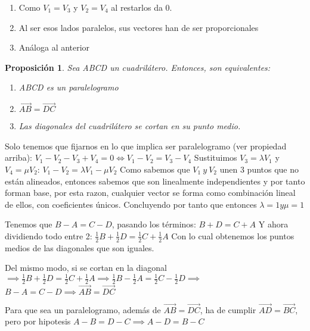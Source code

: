 \documentclass[11pt, a4paper, titlepage]{article}
\makeatletter
\renewenvironment{proof}[1][\proofname] {\vspace{-15pt}\par\pushQED{\qed}\normalfont\topsep6\p@\@plus6\p@\relax\trivlist\item[\hskip\labelsep\it#1\@addpunct{.}]\ignorespaces}{\popQED\endtrivlist\@endpefalse}
\renewcommand{\vec}{\overrightarrow}
\renewenvironment{proof}[1][\proofname] {\par\pushQED{\qed}\normalfont\topsep6\p@\@plus6\p@\relax\trivlist\item[\hskip\labelsep\itshape\sffamily#1\@addpunct{.}]\ignorespaces}{\popQED\endtrivlist\@endpefalse}
\theoremstyle{theorem-style}
\newtheorem{nprop}{Proposición}[section]
\theoremstyle{definition-style}
\theoremstyle{remark-style}
\theoremstyle{example-style}
\newenvironment{nlist}
{\begin{enumerate}
    \renewcommand\labelenumi{(\emph{\roman{enumi})}}}
  {\end{enumerate}}
\makeatother
\begin{document}
\begin{proof}
	\begin{nlist} 
		\item Como $V_1 = V_3$ y $V_2 = V_4$ al restarlos da 0.
		\item Al ser esos lados paralelos, sus vectores han de ser proporcionales
		\item Análoga al anterior
	\end{nlist}
\end{proof}


\begin{nprop}
  Sea ABCD un cuadrilátero. Entonces, son equivalentes:
  \begin{nlist}
  \item ABCD es un paralelogramo
  \item $\vec{AB} = \vec{DC}$
  \item Las diagonales del cuadrilátero se cortan en su punto medio.
  \end{nlist}
\end{nprop}


\begin{proof}\hfill
  Solo tenemos que fijarnos en lo que implica ser paralelogramo (ver propiedad arriba):
  $V_{1} - V_{2} - V_{3} + V_{4} = 0 \Leftrightarrow V_{1} - V_{2} = V_{3} - V_{4} $
  Sustituimos $V_{3} = \lambda V_{1}$ y $V_{4} = \mu V_{2}$:
  $V_{1} - V_{2} = \lambda V_{1} - \mu V_{2}$
  Como sabemos que $V_{1}\ y\ V_{2}$ unen 3 puntos que no están alineados, entonces sabemos que son linealmente independientes y por
  tanto forman base, por esta razon, cualquier vector se forma como combinación lineal de ellos, con coeficientes únicos.
  Concluyendo por tanto que entonces $\lambda = 1 y \mu = 1$

  Tenemos que $B - A = C - D$, pasando los términos:
  $B + D = C + A$
  Y ahora dividiendo todo entre 2:
  $\frac{1}{2}B + \frac{1}{2}D = \frac{1}{2}C + \frac{1}{2}A$
  Con lo cual obtenemos los puntos medios de las diagonales que son iguales.

   Del mismo modo, si se cortan en la diagonal 
  $\implies \frac{1}{2}B + \frac{1}{2}D = \frac{1}{2}C + \frac{1}{2}A \implies 
  \frac{1}{2}B - \frac{1}{2}A = \frac{1}{2}C - \frac{1}{2}D \implies $ $B - A = C - D \implies \vec{AB} = \vec{DC}$
  
   Para que sea un paralelogramo, además de $\vec{AB} = \vec{DC}$, ha de cumplir $\vec{AD} = \vec{BC}$, pero por hipotesis $A - B = D - C \implies A - D = B - C$
  
\end{proof}
\end{document}
